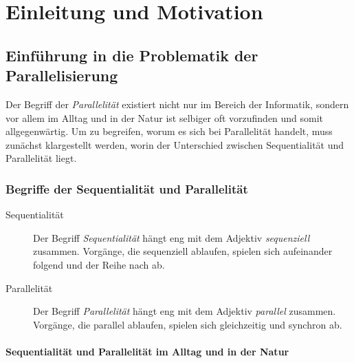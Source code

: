 
\chapter{Einleitung und Motivation}

	\section{Einführung in die Problematik der Parallelisierung}

		Der Begriff der \textit{Parallelität} existiert nicht nur im Bereich der Informatik, sondern vor allem im Alltag und in der Natur ist selbiger oft vorzufinden und somit allgegenwärtig. Um zu begreifen, worum es sich bei Parallelität handelt, muss zunächst klargestellt werden, worin der Unterschied zwischen Sequentialität und Parallelität liegt.

		\subsection{Begriffe der Sequentialität und Parallelität}

			\begin{description}
			  \item[Sequentialität]
				  Der Begriff \textit{Sequentialität} hängt eng mit dem Adjektiv \textit{sequenziell} zusammen. Vorgänge, die sequenziell ablaufen, spielen sich aufeinander folgend und der Reihe nach ab. \cite{SequentiellDuden}
			  \item[Parallelität]
				  Der Begriff \textit{Parallelität} hängt eng mit dem Adjektiv \textit{parallel} zusammen. Vorgänge, die parallel ablaufen, spielen sich gleichzeitig und synchron ab. \cite{ParallelDuden}
			\end{description}

			\subsubsection{Sequentialität und Parallelität im Alltag und in der Natur}
			
